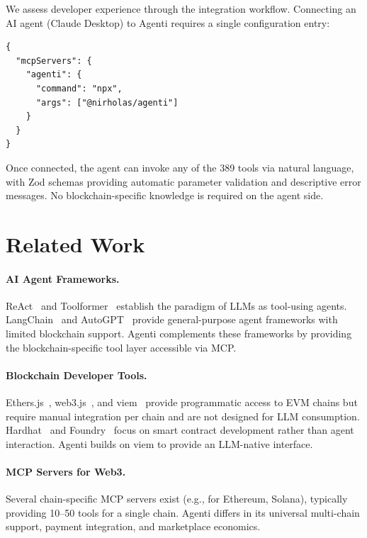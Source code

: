 \documentclass[11pt]{article}
\begin{document}
We assess developer experience through the integration workflow. Connecting an AI agent (Claude Desktop) to Agenti requires a single configuration entry:

\begin{lstlisting}[language={}]
{
  "mcpServers": {
    "agenti": {
      "command": "npx",
      "args": ["@nirholas/agenti"]
    }
  }
}
\end{lstlisting}

Once connected, the agent can invoke any of the 389 tools via natural language, with Zod schemas providing automatic parameter validation and descriptive error messages. No blockchain-specific knowledge is required on the agent side.

\section{Related Work}
\label{sec:related}

\paragraph{AI Agent Frameworks.} ReAct~\cite{yao2023react} and Toolformer~\cite{schick2023toolformer} establish the paradigm of LLMs as tool-using agents. LangChain~\cite{langchain} and AutoGPT~\cite{autogpt} provide general-purpose agent frameworks with limited blockchain support. Agenti complements these frameworks by providing the blockchain-specific tool layer accessible via MCP.

\paragraph{Blockchain Developer Tools.} Ethers.js~\cite{ethersjs}, web3.js~\cite{web3js}, and viem~\cite{viem} provide programmatic access to EVM chains but require manual integration per chain and are not designed for LLM consumption. Hardhat~\cite{hardhat} and Foundry~\cite{foundry} focus on smart contract development rather than agent interaction. Agenti builds on viem to provide an LLM-native interface.

\paragraph{MCP Servers for Web3.} Several chain-specific MCP servers exist (e.g., for Ethereum, Solana), typically providing 10--50 tools for a single chain. Agenti differs in its universal multi-chain support, payment integration, and marketplace economics.
\end{document}
